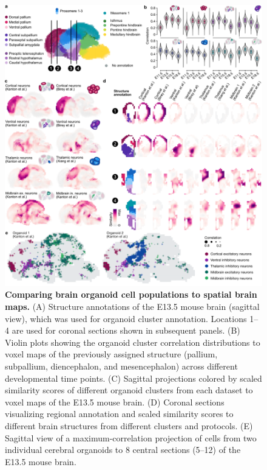 \begin{figure}[t!]
    \centering
	\includegraphics[width=\textwidth]{figures/voxhunt/Figure_4}
    \caption{\textbf{Comparing brain organoid cell populations to spatial brain maps.} (A) Structure annotations of the E13.5 mouse brain (sagittal view), which was used for organoid cluster annotation. Locations 1–4 are used for coronal sections shown in subsequent panels. (B) Violin plots showing the organoid cluster correlation distributions to voxel maps of the previously assigned structure (pallium, subpallium, diencephalon, and mesencephalon) across different developmental time points. (C) Sagittal projections colored by scaled similarity scores of different organoid clusters from each dataset to voxel maps of the E13.5 mouse brain. (D) Coronal sections visualizing regional annotation and scaled similarity scores to different brain structures from different clusters and protocols. (E) Sagittal view of a maximum-correlation projection of cells from two individual cerebral organoids to 8 central sections (5–12) of the E13.5 mouse brain.}
    \label{fig:vox4}
\end{figure}


